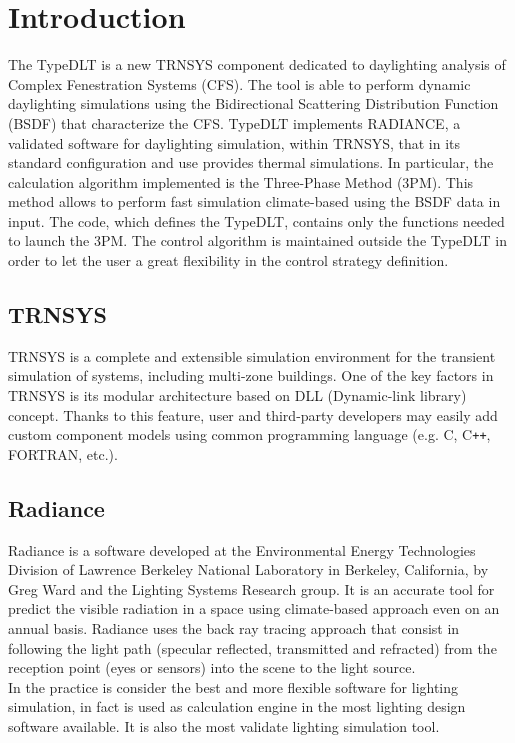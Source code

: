 \chapter{Introduction}
The TypeDLT is a new TRNSYS component dedicated to daylighting analysis of Complex Fenestration Systems (CFS).  The tool is able to perform dynamic daylighting simulations using the Bidirectional Scattering Distribution Function (BSDF) that characterize the CFS.   
TypeDLT implements RADIANCE, a validated software for daylighting simulation, within TRNSYS, that in its standard configuration and use provides thermal simulations. In particular, the calculation algorithm implemented is the Three-Phase Method (3PM). This method allows to perform fast simulation climate-based using the BSDF data in input. 
The code, which defines the TypeDLT, contains only the functions needed to launch the 3PM. The control algorithm is maintained outside the TypeDLT in order to let the user a great flexibility in the control strategy definition. 

\section{TRNSYS}
TRNSYS \cite{trnsys} is a complete and extensible simulation environment for the transient simulation of systems, including multi-zone buildings. One of the key factors in TRNSYS is its modular architecture based on DLL (Dynamic-link library) concept. Thanks to this feature, user and third-party developers may easily add custom component models using common programming language (e.g. C, C\texttt{++}, FORTRAN, etc.).

\section{Radiance} 

Radiance \cite{radiance} is a software developed at the Environmental Energy Technologies Division of Lawrence Berkeley National Laboratory in Berkeley, California, by Greg Ward and the Lighting Systems Research group. It is an accurate tool for predict the visible radiation in a space using climate-based approach even on an annual basis. Radiance uses the back ray tracing approach that consist in following the light path (specular reflected, transmitted and refracted) from the reception point (eyes or sensors) into the scene to the light source.\\
In the practice is consider the best and more flexible software for lighting simulation, in fact is used as calculation engine in the most lighting design software available. It is also the most validate lighting simulation tool.


